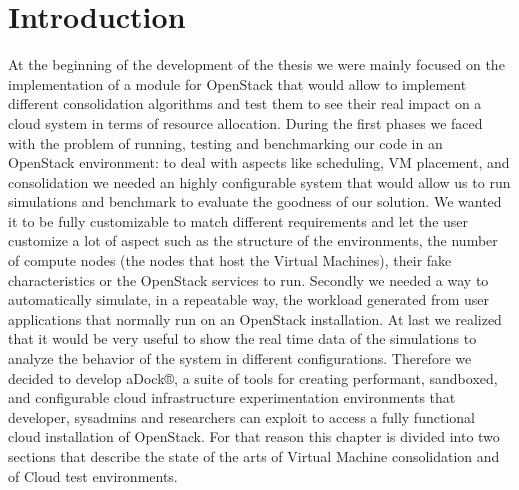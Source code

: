 \section{Introduction}
\label{sec:sota_intro}
At the beginning of the development of the thesis we were mainly focused on the implementation of a module for OpenStack that would allow to implement different consolidation algorithms and test them to see their real impact on a cloud system in terms of resource allocation. During the first phases we faced with the problem of running, testing and benchmarking our code in an OpenStack environment: to deal with aspects like scheduling, VM placement, and consolidation we needed an highly configurable system that would allow us to run simulations and benchmark to evaluate the goodness of our solution. We wanted it to be fully customizable to match different requirements and let the user customize a lot of aspect such as the structure of the environments, the number of compute nodes (the nodes that host the Virtual Machines), their fake characteristics or the OpenStack services to run. Secondly we needed a way to automatically simulate, in a repeatable way, the workload generated from user applications that normally run on an OpenStack installation. At last we realized that it would be very useful to show the real time data of the simulations to analyze the behavior of the system in different configurations.
Therefore we decided to develop aDock®, a suite of tools for creating performant, sandboxed, and configurable cloud infrastructure experimentation environments that developer, sysadmins and researchers can exploit to access a fully functional cloud installation of OpenStack.
For that reason this chapter is divided into two sections that describe the state of the arts of Virtual Machine consolidation and of Cloud test environments.

